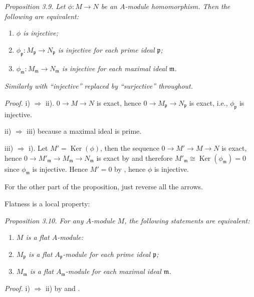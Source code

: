 \noindent\textit{Proposition 3.9. Let $\phi:M\longrightarrow N$ be an $A$-module homomorphism. Then the following are equivalent:}
\begin{enumerate}
\renewcommand{\labelenumi}{\roman{enumi})}
\item \textit{$\phi$ is injective;}
\item \textit{$\phi_{\mathfrak p}:M_{\mathfrak p}\longrightarrow N_{\mathfrak p}$ is injective for each prime ideal $\mathfrak p$;}
\item \textit{$\phi_{\mathfrak m}:M_{\mathfrak m}\longrightarrow N_{\mathfrak m}$ is injective for each maximal ideal $\mathfrak m$.}
\end{enumerate}
\textit{Similarly with ``injective'' replaced by ``surjective'' throughout.}

\noindent\textit{Proof.} i) $\Rightarrow$ ii). $0\longrightarrow M\longrightarrow N$ is exact, hence $0\longrightarrow M_{\mathfrak p}\longrightarrow N_{\mathfrak p}$ is exact, i.e., $\phi_{\mathfrak p}$ is injective.

ii) $\Rightarrow$ iii) because a maximal ideal is prime.

iii) $\Rightarrow$ i). Let $M'=\operatorname{Ker}(\phi)$, then the sequence $0\longrightarrow M'\longrightarrow M\longrightarrow N$ is exact, hence $0\longrightarrow M'_{\mathfrak m}\longrightarrow M_{\mathfrak m}\longrightarrow N_{\mathfrak m}$ is exact by  and therefore $M'_{\mathfrak m}\cong\operatorname{Ker}(\phi_{\mathfrak m})=0$ since $\phi_{\mathfrak m}$ is injective. Hence $M'=0$ by , hence $\phi$ is injective.

For the other part of the proposition, just reverse all the arrows. \proofbox

Flatness is a local property:

\noindent\textit{Proposition 3.10. For any $A$-module $M$, the following statements are equivalent:}
\begin{enumerate}
\renewcommand{\labelenumi}{\roman{enumi})}
\item \textit{$M$ is a flat $A$-module:}
\item \textit{$M_{\mathfrak p}$ is a flat $A_{\mathfrak p}$-module for each prime ideal $\mathfrak p$;}
\item \textit{$M_{\mathfrak m}$ is a flat $A_{\mathfrak m}$-module for each maximal ideal $\mathfrak m$.}
\end{enumerate}

\noindent\textit{Proof.} i) $\Rightarrow$ ii) by  and .

